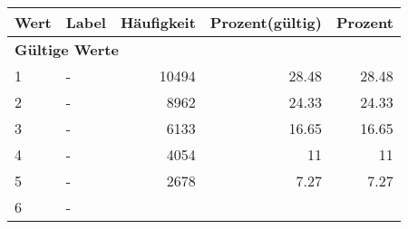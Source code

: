      \begin{longtable}{lXrrr}
     \toprule
     \textbf{Wert} & \textbf{Label} & \textbf{Häufigkeit} & \textbf{Prozent(gültig)} & \textbf{Prozent} \\
     \endhead
     \midrule
     \multicolumn{5}{l}{\textbf{Gültige Werte}}\\

     1 &
     \multicolumn{1}{X}{ -  } &


       \num{10494} &
       \num[round-mode=places,round-precision=2]{28.48} &
         \num[round-mode=places,round-precision=2]{28.48} \\

     2 &
     \multicolumn{1}{X}{ -  } &


       \num{8962} &
       \num[round-mode=places,round-precision=2]{24.33} &
         \num[round-mode=places,round-precision=2]{24.33} \\

     3 &
     \multicolumn{1}{X}{ -  } &


       \num{6133} &
       \num[round-mode=places,round-precision=2]{16.65} &
         \num[round-mode=places,round-precision=2]{16.65} \\

     4 &
     \multicolumn{1}{X}{ -  } &


       \num{4054} &
       \num[round-mode=places,round-precision=2]{11} &
         \num[round-mode=places,round-precision=2]{11} \\

     5 &
     \multicolumn{1}{X}{ -  } &


       \num{2678} &
       \num[round-mode=places,round-precision=2]{7.27} &
         \num[round-mode=places,round-precision=2]{7.27} \\

     6 &
     \multicolumn{1}{X}{ -  } &



\end{longtable}
